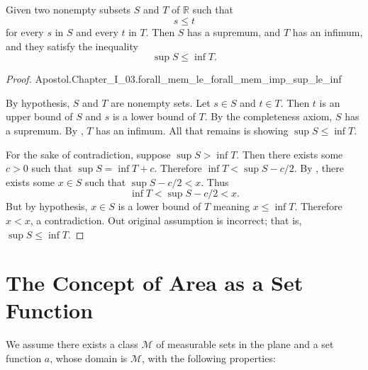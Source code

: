 \documentclass{report}
\begin{document}
\section{}%
\label{sec:theorem-i.34}

\begin{theorem}[I.34]

  Given two nonempty subsets $S$ and $T$ of $\mathbb{R}$ such that $$s \leq t$$
    for every $s$ in $S$ and every $t$ in $T$. Then $S$ has a supremum, and $T$
    has an infimum, and they satisfy the inequality $$\sup{S} \leq \inf{T}.$$

\end{theorem}

\begin{proof}

    {Apostol.Chapter\_I\_03.forall\_mem\_le\_forall\_mem\_imp\_sup\_le\_inf}

  By hypothesis, $S$ and $T$ are nonempty sets.
  Let $s \in S$ and $t \in T$.
  Then $t$ is an upper bound of $S$ and $s$ is a lower bound of $T$.
  By the completeness axiom, $S$ has a supremum.
  By , $T$ has an infimum.
  All that remains is showing $\sup{S} \leq \inf{T}$.

  For the sake of contradiction, suppose $\sup{S} > \inf{T}$.
  Then there exists some $c > 0$ such that $\sup{S} = \inf{T} + c$.
  Therefore $\inf{T} < \sup{S} - c / 2$.
  By , there exists some $x \in S$ such that
    $\sup{S} - c / 2 < x$.
  Thus $$\inf{T} < \sup{S} - c / 2 < x.$$
  But by hypothesis, $x \in S$ is a lower bound of $T$ meaning $x \leq \inf{T}$.
  Therefore $x < x$, a contradiction.
  Out original assumption is incorrect; that is, $\sup{S} \leq \inf{T}$.

\end{proof}

\chapter{The Concept of Area as a Set Function}%
\label{chap:concept-area-set-function}

We assume there exists a class $\mathscr{M}$ of measurable sets in the plane and
  a set function $a$, whose domain is $\mathscr{M}$, with the following
  properties:

\section{}%
\label{sec:nonnegative-property}
\end{document}
